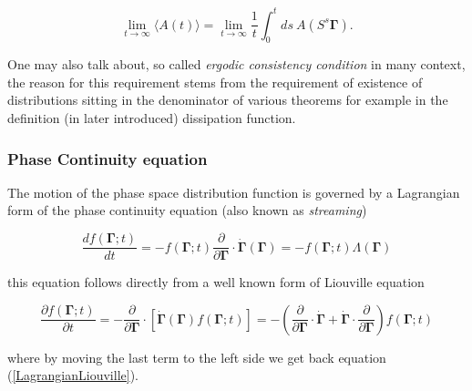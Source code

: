 \documentclass[a4paper,12pt]{article}
\begin{document}
\begin{equation}
    \lim_{t \to \infty} \langle A(t) \rangle = \lim_{t \to \infty} \frac{1}{t} \int_0^t ds\ A(S^s \bm{\Gamma}).
\end{equation}

One may also talk about, so called \textit{ergodic consistency condition} in many context, the reason for this requirement stems from the requirement of existence of distributions sitting in the denominator of various theorems for example in the definition (in later introduced) dissipation function.

\subsubsection{Phase Continuity equation}



The motion of the phase space distribution function is governed by a Lagrangian form of the phase continuity equation (also known as \textit{streaming})

\begin{equation}
\label{LagrangianLiouville}
  \frac{df(\bm{\Gamma};t)}{dt}=-f(\bm{\Gamma};t)\frac{\partial}{\partial \bm{\Gamma}} \cdot \dot{\bm{\Gamma}}(\bm{\Gamma}) = -f(\bm{\Gamma};t)\Lambda(\bm{\Gamma})
\end{equation}

this equation follows directly from a well known form of Liouville equation

\begin{equation}
    \frac{\partial f(\bm{\Gamma};t) }{\partial t}
    = -\frac{\partial}{\partial \bm{\Gamma}} \cdot [\dot{\bm{\Gamma}}(\bm{\Gamma}) f(\bm{\Gamma};t)]
     = -(\frac{\partial}{\partial \bm{\Gamma}} \cdot \dot{\bm{\Gamma}} + \dot{\bm{\Gamma}} \cdot \frac{\partial}{\partial \bm{\Gamma}}) f(\bm{\Gamma};t)
\end{equation}

where by moving the last term to the left side we get back equation (\ref{LagrangianLiouville}).
\end{document}
